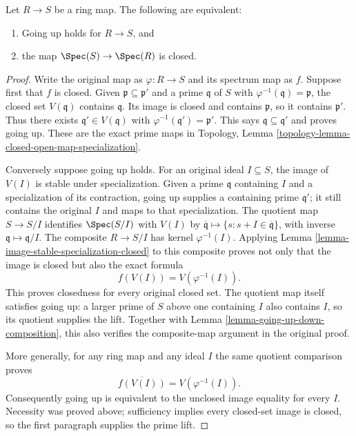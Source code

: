 \begin{lemma}
\label{lemma-going-up-closed}
Let $R \to S$ be a ring map. The following are equivalent:
\begin{enumerate}
\item Going up holds for $R \to S$, and
\item the map $\Spec(S) \to \Spec(R)$ is closed.
\end{enumerate}
\end{lemma}

\begin{proof}
Write the original map as $\varphi:R\to S$ and its
spectrum map as $f$. Suppose first that $f$ is closed.
Given $\mathfrak p\subseteq\mathfrak p'$ and a prime
$\mathfrak q$ of $S$ with $\varphi^{-1}(\mathfrak q)=\mathfrak p$,
the closed set $V(\mathfrak q)$ contains $\mathfrak q$.
Its image is closed and contains $\mathfrak p$, so it
contains $\mathfrak p'$. Thus there exists
$\mathfrak q'\in V(\mathfrak q)$ with
$\varphi^{-1}(\mathfrak q')=\mathfrak p'$.
This says $\mathfrak q\subseteq\mathfrak q'$ and proves
going up. These are the exact prime maps in
Topology, Lemma \ref{topology-lemma-closed-open-map-specialization}.

Conversely suppose going up holds. For an original
ideal $I\subseteq S$, the image of $V(I)$ is stable
under specialization. Given a prime $\mathfrak q$
containing $I$ and a specialization of its contraction,
going up supplies a containing prime $\mathfrak q'$;
it still contains the original $I$ and maps to that
specialization. The quotient map $S\to S/I$ identifies
$\Spec(S/I)$ with $V(I)$ by
$\overline{\mathfrak q}\mapsto\{s:s+I\in\overline{\mathfrak q}\}$,
with inverse $\mathfrak q\mapsto\mathfrak q/I$.
The composite $R\to S/I$ has kernel $\varphi^{-1}(I)$.
Applying Lemma \ref{lemma-image-stable-specialization-closed}
to this composite proves not only that the image is
closed but also the exact formula
$$
f(V(I))=V(\varphi^{-1}(I)).
$$
This proves closedness for every original closed set.
The quotient map itself satisfies going up: a larger
prime of $S$ above one containing $I$ also contains
$I$, so its quotient supplies the lift. Together
with Lemma \ref{lemma-going-up-down-composition}, this
also verifies the composite-map argument in the original proof.

More generally, for any ring map and any ideal $I$
the same quotient comparison proves
$$
\overline{f(V(I))}=V(\varphi^{-1}(I)).
$$
Consequently going up is equivalent to the unclosed
image equality for every $I$. Necessity was proved
above; sufficiency implies every closed-set image is
closed, so the first paragraph supplies the prime lift.
\end{proof}